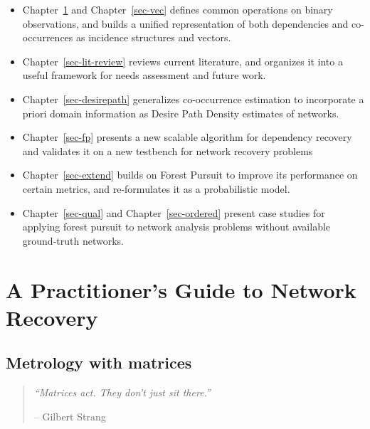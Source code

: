 \documentclass[%
	12pt,
		oneside,
		letterpaper
]{book}
\providecommand{\tightlist}{%
  \setlength{\itemsep}{0pt}\setlength{\parskip}{0pt}}\usepackage{longtable,booktabs,array}
\begin{document}
\begin{itemize}
\tightlist
\item
  Chapter~\ref{sec-mat-met} and Chapter~\ref{sec-vec} defines common operations on binary observations, and builds a unified representation of both dependencies and co-occurrences as incidence structures and vectors.
\item
  Chapter~\ref{sec-lit-review} reviews current literature, and organizes it into a useful framework for needs assessment and future work.
\item
  Chapter~\ref{sec-desirepath} generalizes co-occurrence estimation to incorporate a priori domain information as Desire Path Density estimates of networks.\\
\item
  Chapter~\ref{sec-fp} presents a new scalable algorithm for dependency recovery and validates it on a new testbench for network recovery problems
\item
  Chapter~\ref{sec-extend} builds on Forest Pursuit to improve its performance on certain metrics, and re-formulates it as a probabilistic model.
\item
  Chapter~\ref{sec-qual} and Chapter~\ref{sec-ordered} present case studies for applying forest pursuit to network analysis problems without available ground-truth networks.
\end{itemize}

\part{A Practitioner's Guide to Network Recovery}

\chapter{Metrology with matrices}\label{sec-mat-met}

\begin{flushright}

\begin{minipage}{.7\linewidth}

\singlespacing

\begin{quote}
\emph{``Matrices act. They don't just sit there.''}

\hfill -- Gilbert Strang\\
\end{quote}

\doublespacing

\end{minipage}

\end{flushright}
\end{document}
